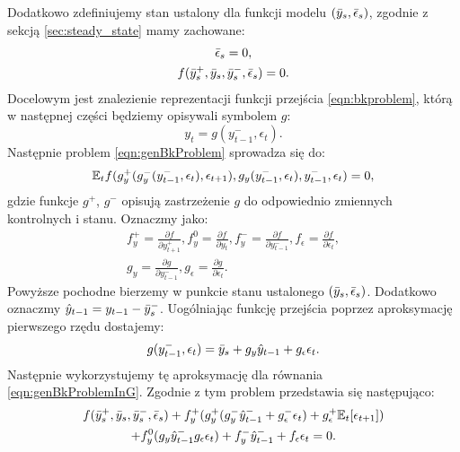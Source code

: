Dodatkowo zdefiniujemy stan ustalony dla funkcji modelu $(\bar{y}_s, \bar{\epsilon}_s)$, zgodnie z sekcją \ref{sec:steady_state} mamy zachowane:
\begin{gather}
    \bar{\epsilon}_s = 0, \\
    f(\bar{y}_s^+, \bar{y}_s, \bar{y}_s^-, \bar{\epsilon}_s) = 0.
\end{gather}
Docelowym jest znalezienie reprezentacji funkcji przejścia \eqref{eqn:bkproblem}, którą w następnej części będziemy opisywali symbolem $g$:
\begin{equation}
    \label{eq:bk_general_state_function}
    y_t = g(y^-_{t-1}, \epsilon_t).
\end{equation}
Następnie problem \eqref{eqn:genBkProblem} sprowadza się do:
\begin{equation}
    \label{eqn:genBkProblemInG}
    \mathbb{E}_t f(g_y^+(g_y^-(y_{t-1}^-, \epsilon_t), \epsilon_{t+1}), g_y(y_{t-1}^-, \epsilon_t), y_{t-1}^-, \epsilon_t) = 0,
\end{equation}
gdzie funkcje $g^+$, $g^-$ opisują zastrzeżenie $g$ do odpowiednio zmiennych kontrolnych i stanu. Oznaczmy jako:
\begin{gather}
    f_y^+ = \frac{\partial f}{\partial y_{t+1}^+},
    f_y^0 = \frac{\partial f}{\partial y_{t}},
    f_y^- = \frac{\partial f}{\partial y_{t-1}^-},
    f_\epsilon = \frac{\partial f}{\partial \epsilon_t}, \\
    g_y = \frac{\partial g}{\partial y_{t-1}^-}, g_\epsilon = \frac{\partial g}{\partial \epsilon_t}.
\end{gather}
Powyższe pochodne bierzemy w punkcie stanu ustalonego $(\bar{y}_s, \bar{\epsilon}_s)$. Dodatkowo oznaczmy $\hat{y}_{t-1} = y_{t-1} - \bar{y}_s^-$. Uogólniając funkcję przejścia poprzez aproksymację pierwszego rzędu dostajemy:
\begin{equation}
    g(y_{t-1}^-, \epsilon_t) = \bar{y}_s + g_y \hat{y}_{t-1} + g_\epsilon \epsilon_t.
\end{equation}
Następnie wykorzystujemy tę aproksymację dla równania \eqref{eqn:genBkProblemInG}. Zgodnie z tym problem przedstawia się następująco:
\begin{multline}
    f(\bar{y}_s^+, \bar{y}_s, \bar{y}_s^-, \bar{\epsilon}_s) + f_y^+(g_y^+(g_y^-\hat{y}_{t-1}^- + g_\epsilon^-\epsilon_t) + g_\epsilon^+\mathbb{E}_t[\epsilon_{t+1}]) \\ + f_y^0(g_y \hat{y}_{t-1}^- g_\epsilon \epsilon_t) + f_y^- \hat{y}_{t-1}^- + f_\epsilon \epsilon_t = 0.
\end{multline}
